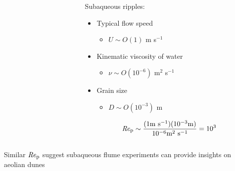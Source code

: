 \documentclass{beamer}
\newcommand\Rey{\mbox{\textit{Re}}}  %
\begin{document}
\begin{frame}
\begin{columns}[t]
\begin{column}{0.5\textwidth}
    \end{column}

    \begin{column}{0.5\textwidth}

      \centering

      Subaqueous ripples:

      \begin{itemize}
      \item Typical flow speed 
        \begin{itemize}
        \item $U \sim O(1)$ m s$^{-1}$
        \end{itemize}
      \item Kinematic viscosity of water 
        \begin{itemize}
        \item $\nu \sim O(10^{-6})$ m$^{2}$ s$^{-1}$
        \end{itemize}
      \item Grain size 
        \begin{itemize}
        \item $D \sim O(10^{-3})$ m
        \end{itemize}
      \end{itemize}

      \begin{equation}
        \Rey_{\text{p}} \sim \frac{(1 \text{m s}^{-1})(10^{-3} \text{m})}{10^{-6} \text{m}^{2} \text{ s}^{-1}} = 10^{3} \nonumber
      \end{equation}

    \end{column}

  \end{columns}

  \vspace{1cm}

  Similar $\Rey_{\text{p}}$ suggest subaqueous flume experiments can provide insights on aeolian dunes

\end{frame}
\end{document}

